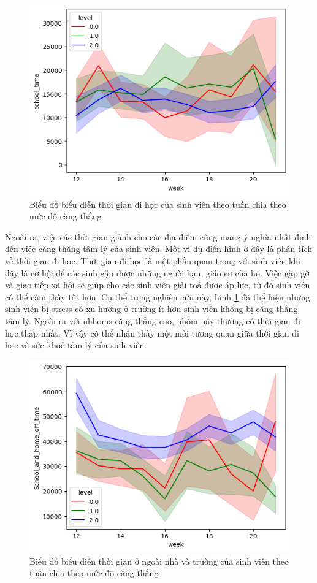 \begin{figure}[!ht]
    \centering
    \includegraphics[width=0.75\linewidth]{Shooltime_week_line.png}
    \caption{Biểu đồ biểu diễn thời gian đi học của sinh viên theo tuần chia theo mức độ căng thẳng}
    \label{line_week_school}
\end{figure}
Ngoài ra, việc các thời gian giành cho các địa điểm cũng mang ý nghĩa nhất định đến việc căng thẳng tâm lý của sinh viên. Một ví dụ điển hình ở đây là phân tích về thời gian đi học. Thời gian đi học là một phần quan trọng với sinh viên khi đây là cơ hội để các sinh gặp được những người bạn, giáo sư của họ. Việc gặp gỡ và giao tiếp xã hội sẽ giúp cho các sinh viên giải toả được áp lực, từ đó sinh viên có thể cảm thấy tốt hơn. Cụ thể trong nghiên cứu này, hình \ref{line_week_school} đã thể hiện những sinh viên bị stress có xu hướng ở trường ít hơn sinh viên không bị căng thẳng tâm lý. Ngoài ra với nhhoms căng thẳng cao, nhóm này thường có thời gian đi học thấp nhất. Vì vậy có thể nhận thấy một mối tương quan giữa thời gian đi học và sức khoẻ tâm lý của sinh viên.

\begin{figure}[!ht]
    \centering
    \includegraphics[width=0.75\linewidth]{line_week_home_a_school_off.png}
    \caption{Biểu đồ biểu diễn thời gian ở ngoài nhà và trường của sinh viên theo tuần chia theo mức độ căng thẳng}
    \label{line_week_homeaschooloff}
\end{figure}


